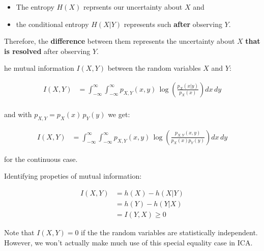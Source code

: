 \begin{frame}{\subsecname}

\begin{itemize}
\item The entropy $H(X)$ reprsents our uncertainty about $X$ 
and 
\item the conditional entropy $H(X|Y)$ represents such \textbf{after} observing $Y$.
\end{itemize}

Therefore, the \textbf{difference} between them represents the uncertainty about $X$ \textbf{that is resolved} after observing $Y$.

\pause
{}he mutual information $I(X,Y)$ between the random variables $X$ and $Y$:



\begin{align}
\label{eq:mutualcont1}
I(X,Y) 
&= \int_{-\infty}^{\infty} \int_{-\infty}^{\infty} p_{X,Y}(x,y) \, \log \left(\frac{p_X(x|y)}{p_X(x)}\right) dx \, dy \\
\end{align}

\pause

and with $p_{X,Y} = p_X(x)\,p_Y(y)$ we get:

\begin{align}
\label{eq:mutualcont2}
I(X,Y)
&= \int_{-\infty}^{\infty} \int_{-\infty}^{\infty} p_{X,Y}(x,y) \, \log \left(\frac{p_{X,Y}(x,y)}{p_X(x) p_Y(y)}\right) dx \, dy
\end{align}

for the continuous case.

\end{frame}

\begin{frame}{\subsecname}

Identifying propeties of mutual information:

\begin{align}
\label{eq:mutualcontprops}
I(X,Y) &= h(X) - h(X|Y)\\
&= h(Y) - h(Y|X)\\
&= I(Y,X) \ge 0
\end{align}

Note that 
$I(X,Y)=0$ if the the random variables are statistically independent. However, we won't actually make much use of this special equality case in ICA.

\end{frame}


